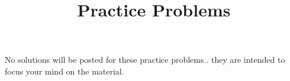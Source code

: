 \documentclass[12pt]{article}
\begin{document}
\newcommand{\ihbar}{\ensuremath{i \hbar}}
\newcommand{\dPsidt}{\ensuremath{ \frac{\partial \Psi}{\partial t} }}
\newcommand{\dPsidx}{\ensuremath{ \frac{\partial \Psi}{\partial x} }}
\newcommand{\ddPsidx}{\ensuremath{ \frac{\partial^2 \Psi}{\partial x^2} }}
\newcommand{\dPssdt}{\ensuremath{ \frac{\partial \Psi^*}{\partial t} }}
\newcommand{\dPssdx}{\ensuremath{ \frac{\partial \Psi^*}{\partial x} }}
\newcommand{\ddPssdx}{\ensuremath{ \frac{\partial^2 \Psi^*}{\partial x^2} }}

\newcommand{\dphidt}{\ensuremath{ \frac{d \phi}{dt} }}
\newcommand{\dpsidx}{\ensuremath{ \frac{d \psi}{dx} }}
\newcommand{\ddpsidx}{\ensuremath{ \frac{d^2 \psi}{dx^2} }}


\date{\vspace{-5ex}}

\title{Practice Problems}

\maketitle

No solutions will be posted for these practice problems.. they are intended to focus your mind on the material.\\[5pt]
\end{document}
